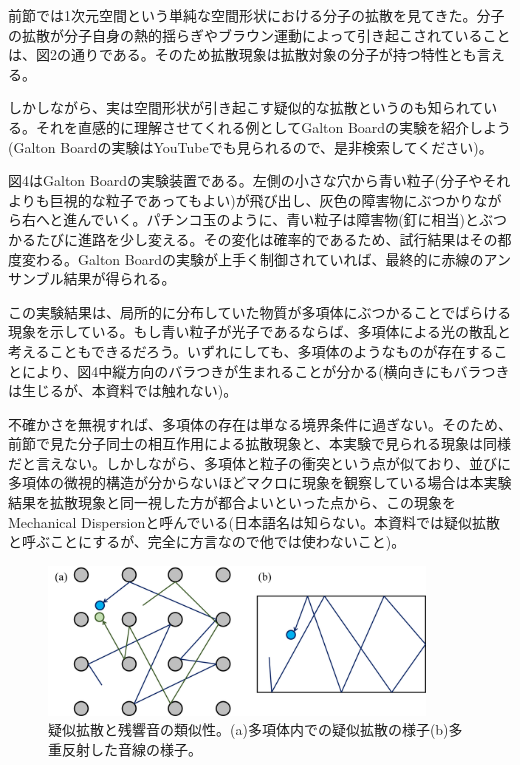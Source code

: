 \documentclass[dvipdfmx, 9pt, a4paper]{jsarticle}
\begin{document}
前節では1次元空間という単純な空間形状における分子の拡散を見てきた。分子の拡散が分子自身の熱的揺らぎやブラウン運動によって引き起こされていることは、図2の通りである。そのため拡散現象は拡散対象の分子が持つ特性とも言える。\par
しかしながら、実は空間形状が引き起こす疑似的な拡散というのも知られている。それを直感的に理解させてくれる例としてGalton Boardの実験を紹介しよう(Galton Boardの実験はYouTubeでも見られるので、是非検索してください)。\par
図4はGalton Boardの実験装置である。左側の小さな穴から青い粒子(分子やそれよりも巨視的な粒子であってもよい)が飛び出し、灰色の障害物にぶつかりながら右へと進んでいく。パチンコ玉のように、青い粒子は障害物(釘に相当)とぶつかるたびに進路を少し変える。その変化は確率的であるため、試行結果はその都度変わる。Galton Boardの実験が上手く制御されていれば、最終的に赤線のアンサンブル結果が得られる。\par
この実験結果は、局所的に分布していた物質が多項体にぶつかることでばらける現象を示している。もし青い粒子が光子であるならば、多項体による光の散乱と考えることもできるだろう。いずれにしても、多項体のようなものが存在することにより、図4中縦方向のバラつきが生まれることが分かる(横向きにもバラつきは生じるが、本資料では触れない)。\par
不確かさを無視すれば、多項体の存在は単なる境界条件に過ぎない。そのため、前節で見た分子同士の相互作用による拡散現象と、本実験で見られる現象は同様だと言えない。しかしながら、多項体と粒子の衝突という点が似ており、並びに多項体の微視的構造が分からないほどマクロに現象を観察している場合は本実験結果を拡散現象と同一視した方が都合よいといった点から、この現象をMechanical Dispersionと呼んでいる(日本語名は知らない。本資料では疑似拡散と呼ぶことにするが、完全に方言なので他では使わないこと)。\par

\begin{figure}[b]
\begin{center}
\includegraphics[width=10cm]{fig5.png}
\caption{疑似拡散と残響音の類似性。(a)多項体内での疑似拡散の様子(b)多重反射した音線の様子。}
\end{center}
\end{figure}
\end{document}
